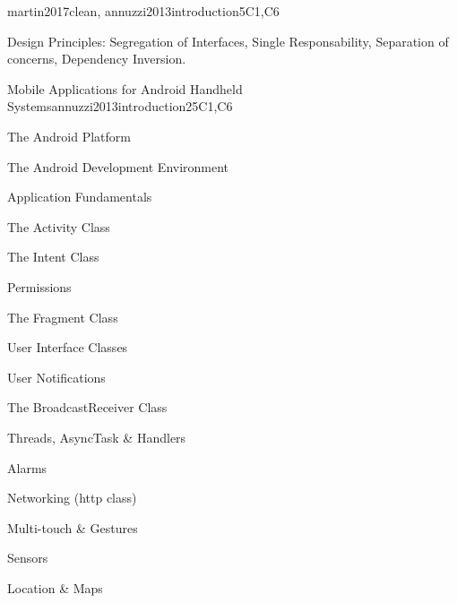 \begin{syllabus}
\begin{unit}{\PBDMobilePlatforms}{}{martin2017clean, annuzzi2013introduction}{5}{C1,C6}
\begin{topics}%
    \item \PBDMobilePlatformsTopicMobile
    \item Design Principles: Segregation of Interfaces, Single Responsability, Separation of concerns, Dependency Inversion.
    \item \PBDMobilePlatformsTopicChallenges
    \item \PBDMobilePlatformsTopicLocation
    \item \PBDMobilePlatformsTopicPerformance
    \item \PBDMobilePlatformsTopicMobilePlatform
    \item \PBDMobilePlatformsTopicEmerging
\end{topics}
\begin{learningoutcomes}
    \item \PBDMobilePlatformsLODesignAndMobile [\Familiarity]
    \item \PBDMobilePlatformsLODiscussTheMobile [\Familiarity]
    \item \PBDMobilePlatformsLODiscussThePower [\Familiarity]
    \item \PBDMobilePlatformsLOCompareAndProgrammingPurpose [\Familiarity]
\end{learningoutcomes}
\end{unit}

\begin{unit}{Mobile Applications for Android Handheld Systems}{}{annuzzi2013introduction}{25}{C1,C6}
\begin{topics}
    \item The Android Platform
    \item The Android Development Environment
    \item Application Fundamentals
    \item The Activity Class
    \item The Intent Class
    \item Permissions
    \item The Fragment Class
    \item User Interface Classes
    \item User Notifications
    \item The BroadcastReceiver Class
    \item Threads, AsyncTask \& Handlers
    \item Alarms
    \item Networking (http class)
    \item Multi-touch \& Gestures
    \item Sensors
    \item Location \& Maps
\end{topics}


\end{unit}
\end{syllabus}
